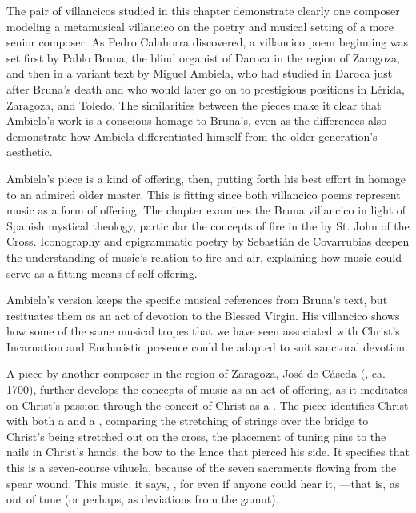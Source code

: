 \documentclass{vcbook-proposal}
\begin{document}

The pair of villancicos studied in this chapter demonstrate clearly one 
composer modeling a metamusical villancico on the poetry and musical setting of 
a more senior composer.
As Pedro Calahorra discovered, a villancico poem beginning  was set first by Pablo Bruna, the blind organist of Daroca in 
the region of Zaragoza, and then in a variant text by Miguel Ambiela, who had 
studied in Daroca just after Bruna's death and who would later go on to 
prestigious positions in Lérida, Zaragoza, and Toledo.%
  \autocite{Calahorra:Suban}
The similarities between the pieces make it clear that Ambiela's work is a 
conscious homage to Bruna's, even as the differences also demonstrate how 
Ambiela differentiated himself from the older generation's aesthetic. 

Ambiela's piece is a kind of offering, then, putting forth his best effort in 
homage to an admired older master.
This is fitting since both villancico poems represent music as a form of 
offering.
The chapter examines the Bruna villancico in light of Spanish mystical 
theology, particular the concepts of fire in the  by St. John of the Cross.
Iconography and epigrammatic poetry by Sebastián de Covarrubias deepen the 
understanding of music's relation to fire and air, explaining how music could 
serve as a fitting means of self-offering.

Ambiela's version keeps the specific musical references from Bruna's text, but 
resituates them as an act of devotion to the Blessed Virgin.
His villancico shows how some of the same musical tropes that we have seen 
associated with Christ's Incarnation and Eucharistic presence could be adapted 
to suit sanctoral devotion. 


A piece by another composer in the region of Zaragoza, José de Cáseda 
(, ca. 1700), further develops the concepts of 
music as an act of offering, as it meditates on Christ's passion through the 
conceit of Christ as a . 
The piece identifies Christ with both a  and a , 
comparing the stretching of strings over the bridge to Christ's being stretched 
out on the cross, the placement of tuning pins to the nails in Christ's hands, 
the bow to the lance that pierced his side.
It specifies that this is a seven-course vihuela, because of the seven 
sacraments flowing from the spear wound.
This music, it says, , for even if anyone could 
hear it, ---that is, as out of tune (or perhaps, as  deviations from 
the gamut). 
\end{document}
